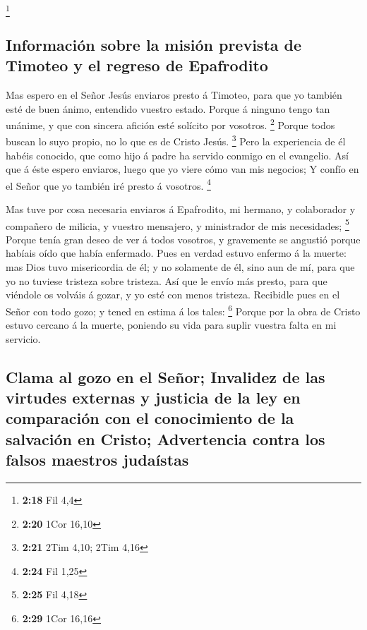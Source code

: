 \footnote{\textbf{2:18} Fil 4,4}

\hypertarget{informaciuxf3n-sobre-la-misiuxf3n-prevista-de-timoteo-y-el-regreso-de-epafrodito}{%
\subsection{Información sobre la misión prevista de Timoteo y el regreso
de
Epafrodito}\label{informaciuxf3n-sobre-la-misiuxf3n-prevista-de-timoteo-y-el-regreso-de-epafrodito}}

 Mas espero en el Señor Jesús enviaros presto á Timoteo,
para que yo también esté de buen ánimo, entendido vuestro estado.
 Porque á ninguno tengo tan unánime, y que con sincera
afición esté solícito por vosotros. \footnote{\textbf{2:20} 1Cor 16,10}
 Porque todos buscan lo suyo propio, no lo que es de Cristo
Jesús. \footnote{\textbf{2:21} 2Tim 4,10; 2Tim 4,16}  Pero
la experiencia de él habéis conocido, que como hijo á padre ha servido
conmigo en el evangelio.  Así que á éste espero enviaros,
luego que yo viere cómo van mis negocios;  Y confío en el
Señor que yo también iré presto á vosotros. \footnote{\textbf{2:24} Fil
  1,25}

 Mas tuve por cosa necesaria enviaros á Epafrodito, mi
hermano, y colaborador y compañero de milicia, y vuestro mensajero, y
ministrador de mis necesidades; \footnote{\textbf{2:25} Fil 4,18}
 Porque tenía gran deseo de ver á todos vosotros, y
gravemente se angustió porque habíais oído que había enfermado.
 Pues en verdad estuvo enfermo á la muerte: mas Dios tuvo
misericordia de él; y no solamente de él, sino aun de mí, para que yo no
tuviese tristeza sobre tristeza.  Así que le envío más
presto, para que viéndole os volváis á gozar, y yo esté con menos
tristeza.  Recibidle pues en el Señor con todo gozo; y
tened en estima á los tales: \footnote{\textbf{2:29} 1Cor 16,16}
 Porque por la obra de Cristo estuvo cercano á la muerte,
poniendo su vida para suplir vuestra falta en mi servicio.

\hypertarget{clama-al-gozo-en-el-seuxf1or-invalidez-de-las-virtudes-externas-y-justicia-de-la-ley-en-comparaciuxf3n-con-el-conocimiento-de-la-salvaciuxf3n-en-cristo-advertencia-contra-los-falsos-maestros-judauxedstas}{%
\subsection{Clama al gozo en el Señor; Invalidez de las virtudes
externas y justicia de la ley en comparación con el conocimiento de la
salvación en Cristo; Advertencia contra los falsos maestros
judaístas}\label{clama-al-gozo-en-el-seuxf1or-invalidez-de-las-virtudes-externas-y-justicia-de-la-ley-en-comparaciuxf3n-con-el-conocimiento-de-la-salvaciuxf3n-en-cristo-advertencia-contra-los-falsos-maestros-judauxedstas}}

